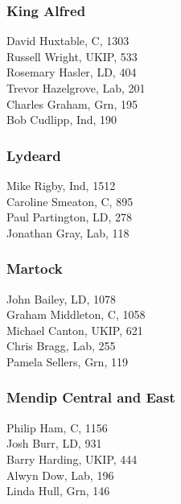 \documentclass[a4paper,openany,10pt]{book}
\begin{document}
\subsubsection*{King Alfred}



David Huxtable, C, 1303\\
Russell Wright, UKIP, 533\\
Rosemary Hasler, LD, 404\\
Trevor Hazelgrove, Lab, 201\\
Charles Graham, Grn, 195\\
Bob Cudlipp, Ind, 190\\


\subsubsection*{Lydeard}



Mike Rigby, Ind, 1512\\
Caroline Smeaton, C, 895\\
Paul Partington, LD, 278\\
Jonathan Gray, Lab, 118\\


\subsubsection*{Martock}



John Bailey, LD, 1078\\
Graham Middleton, C, 1058\\
Michael Canton, UKIP, 621\\
Chris Bragg, Lab, 255\\
Pamela Sellers, Grn, 119\\


\subsubsection*{Mendip Central and East}



Philip Ham, C, 1156\\
Josh Burr, LD, 931\\
Barry Harding, UKIP, 444\\
Alwyn Dow, Lab, 196\\
Linda Hull, Grn, 146\\
\end{document}
